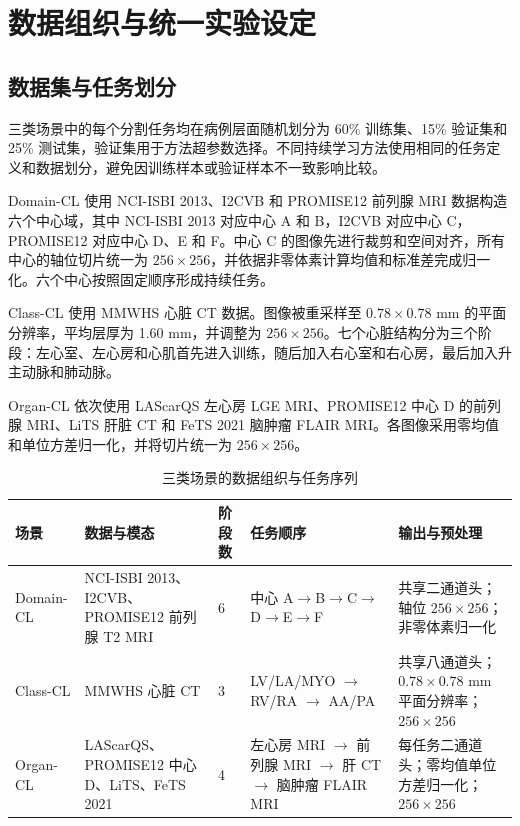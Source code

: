 \section{数据组织与统一实验设定}
\label{sec:benchmark-protocol}

\subsection*{数据集与任务划分}

三类场景中的每个分割任务均在病例层面随机划分为 60\% 训练集、15\% 验证集和 25\% 测试集，验证集用于方法超参数选择。不同持续学习方法使用相同的任务定义和数据划分，避免因训练样本或验证样本不一致影响比较。

Domain-CL 使用 NCI-ISBI 2013、I2CVB 和 PROMISE12 前列腺 MRI 数据构造六个中心域，其中 NCI-ISBI 2013 对应中心 A 和 B，I2CVB 对应中心 C，PROMISE12 对应中心 D、E 和 F\cite{dataset_prostate2,dataset_prostate,dataset_prostate3,dataset_domaincl}。中心 C 的图像先进行裁剪和空间对齐，所有中心的轴位切片统一为 $256\times256$，并依据非零体素计算均值和标准差完成归一化。六个中心按照固定顺序形成持续任务。

Class-CL 使用 MMWHS 心脏 CT 数据\cite{care25ASA1,discussion_inter_seg3,care25ASA2}。图像被重采样至 $0.78\times0.78$ mm 的平面分辨率，平均层厚为 1.60 mm，并调整为 $256\times256$。七个心脏结构分为三个阶段：左心室、左心房和心肌首先进入训练，随后加入右心室和右心房，最后加入升主动脉和肺动脉。

Organ-CL 依次使用 LAScarQS 左心房 LGE MRI、PROMISE12 中心 D 的前列腺 MRI、LiTS 肝脏 CT 和 FeTS 2021 脑肿瘤 FLAIR MRI\cite{dataset_lascars,dataset_lascars2,dataset_prostate3,dataset_taskcl,dataset_taskcl2}。各图像采用零均值和单位方差归一化，并将切片统一为 $256\times256$。

\begin{table}[htbp]
\centering
\caption{三类场景的数据组织与任务序列}
\label{tab:benchmark-datasets}
\thesistablefont
\setlength{\tabcolsep}{3pt}
\renewcommand{\arraystretch}{1.16}
\begin{tabularx}{\textwidth}{@{}p{1.85cm}Xp{2.0cm}XX@{}}
\toprule
场景 & 数据与模态 & 阶段数 & 任务顺序 & 输出与预处理 \\
\midrule
Domain-CL &
NCI-ISBI 2013、I2CVB、PROMISE12 前列腺 T2 MRI &
6 &
中心 A$\rightarrow$B$\rightarrow$C$\rightarrow$\allowbreak D$\rightarrow$E$\rightarrow$F &
共享二通道头；轴位 $256\times256$；非零体素归一化 \\
\addlinespace
Class-CL &
MMWHS 心脏 CT &
3 &
LV/LA/MYO $\rightarrow$ RV/RA $\rightarrow$ AA/PA &
共享八通道头；$0.78\times0.78$ mm 平面分辨率；$256\times256$ \\
\addlinespace
Organ-CL &
LAScarQS、PROMISE12 中心 D、LiTS、FeTS 2021 &
4 &
左心房 MRI $\rightarrow$ 前列腺 MRI $\rightarrow$ 肝 CT $\rightarrow$ 脑肿瘤 FLAIR MRI &
每任务二通道头；零均值单位方差归一化；$256\times256$ \\
\bottomrule
\end{tabularx}

\end{table}

